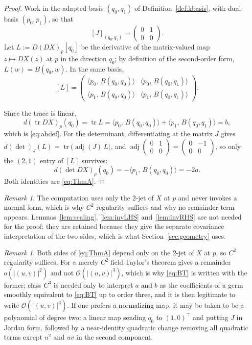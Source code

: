 \documentclass[12pt]{article}
\theoremstyle{plain}
\theoremstyle{definition}
\theoremstyle{remark}
\newtheorem{remark}[theorem]{Remark}
\newcommand{\tr}{\operatorname{tr}}
\DeclareMathOperator{\dt}{det}
\newcommand{\ip}[2]{\langle #1,\, #2\rangle}
\begin{document}
	\begin{proof}
		Work in the adapted basis $(q_{0},q_{1})$ of
		Definition~\ref{def:kbasis}, with dual basis $(p_{0},p_{1})$, so that
		\[
		[J]_{(q_{0},q_{1})}=\begin{pmatrix}0&1\\ 0&0\end{pmatrix}.
		\]
		Let $L:=D(DX)_{p}[q_{0}]$ be the derivative of the matrix-valued map
		$z\mapsto DX(z)$ at $p$ in the direction $q_{0}$; by definition of the
		second-order form, $L(w)=B(q_{0},w)$.  In the same basis,
		\[
		[L]=\begin{pmatrix}
			\ip{p_{0}}{B(q_{0},q_{0})} & \ip{p_{0}}{B(q_{0},q_{1})}\\[2pt]
			\ip{p_{1}}{B(q_{0},q_{0})} & \ip{p_{1}}{B(q_{0},q_{1})}
		\end{pmatrix}.
		\]
		
		Since the trace is linear,
		\[
		d(\tr DX)_{p}(q_{0})=\tr L
		=\ip{p_{0}}{B(q_{0},q_{0})}+\ip{p_{1}}{B(q_{0},q_{1})}=b,
		\]
		which is \eqref{eq:abdef}.  For the determinant, differentiating at the
		matrix $J$ gives $d(\dt)_{J}(L)=\tr\bigl(\operatorname{adj}(J)\,L\bigr)$,
		and
		$\operatorname{adj}\left(\begin{smallmatrix}0&1\\0&0\end{smallmatrix}\right)
		=\left(\begin{smallmatrix}0&-1\\0&0\end{smallmatrix}\right)$, so only
		the $(2,1)$ entry of $[L]$ survives:
		\[
		d(\dt DX)_{p}(q_{0})=-\ip{p_{1}}{B(q_{0},q_{0})}=-2a .
		\]
		Both identities are \eqref{eq:ThmA}.
	\end{proof}
	
	\begin{remark}
		The computation uses only the $2$-jet of $X$ at $p$ and never invokes a
		normal form, which is why $C^{2}$ regularity suffices and why no
		remainder term appears.  Lemmas~\ref{lem:scaling},
		\ref{lem:invLHS} and~\ref{lem:invRHS} are not needed for the proof;
		they are retained because they give the separate covariance
		interpretation of the two sides, which is what
		Section~\ref{sec:geometry} uses.
	\end{remark}
	
	\begin{remark}\label{rem:regularity}
		Both sides of \eqref{eq:ThmA} depend only on the $2$-jet of $X$ at $p$,
		so $C^{2}$ regularity suffices.  For a merely $C^{2}$ field Taylor's
		theorem gives a remainder $o(|(u,v)|^{2})$ and not
		$\mathcal O(|(u,v)|^{3})$, which is why \eqref{eq:BT} is written with
		the former; class $C^{3}$ is needed only to interpret $a$ and $b$ as
		the coefficients of a germ smoothly equivalent to \eqref{eq:BT} up to
		order three, and it is then legitimate to write
		$\mathcal O(|(u,v)|^{3})$.  If one prefers a normalizing map, it may be
		taken to be a polynomial of degree two: a linear map sending $q_{0}$ to
		$(1,0)^{\top}$ and putting $J$ in Jordan form, followed by a
		near-identity quadratic change removing all quadratic terms except
		$u^{2}$ and $uv$ in the second component.
	\end{remark}
	
\end{document}
